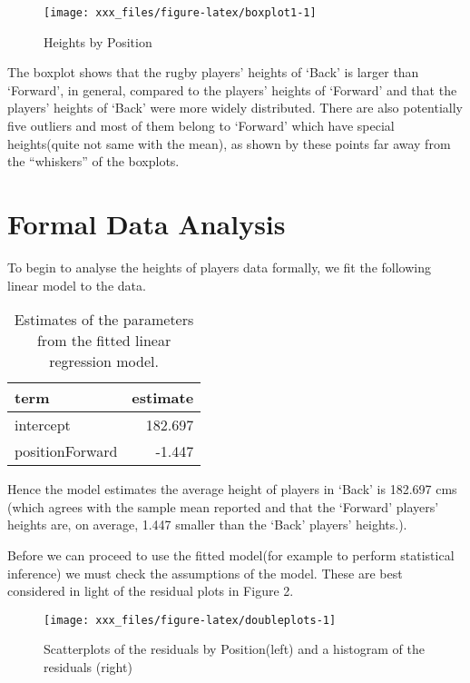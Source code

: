 \documentclass[
]{article}
\begin{document}
\begin{figure}[H]

{\centering \texttt{[image: xxx\_files/figure-latex/boxplot1-1]} 

}

\caption{\label{fig:box} Heights by Position}\label{fig:boxplot1}
\end{figure}

The boxplot shows that the rugby players' heights of `Back' is larger
than `Forward', in general, compared to the players' heights of
`Forward' and that the players' heights of `Back' were more widely
distributed. There are also potentially five outliers and most of them
belong to `Forward' which have special heights(quite not same with the
mean), as shown by these points far away from the ``whiskers'' of the
boxplots.

\hypertarget{sec:FDA}{%
\section{Formal Data Analysis}\label{sec:FDA}}

To begin to analyse the heights of players data formally, we fit the
following linear model to the data.

\begin{table}[!h]

\caption{\label{tab:modeltable}\label{tab:reg} Estimates of the parameters from the fitted linear regression model.}
\centering
\begin{tabular}[t]{l|r}
\hline
term & estimate\\
\hline
intercept & 182.697\\
\hline
positionForward & -1.447\\
\hline
\end{tabular}
\end{table}

Hence the model estimates the average height of players in `Back' is
182.697 cms (which agrees with the sample mean reported and that the
`Forward' players' heights are, on average, 1.447 smaller than the
`Back' players' heights.).

Before we can proceed to use the fitted model(for example to perform
statistical inference) we must check the assumptions of the model. These
are best considered in light of the residual plots in Figure 2.

\begin{figure}[H]

{\centering \texttt{[image: xxx\_files/figure-latex/doubleplots-1]} 

}

\caption{\label{fig:resids} Scatterplots of the residuals by Position(left) and a histogram of the residuals (right)}\label{fig:doubleplots}
\end{figure}
\end{document}
